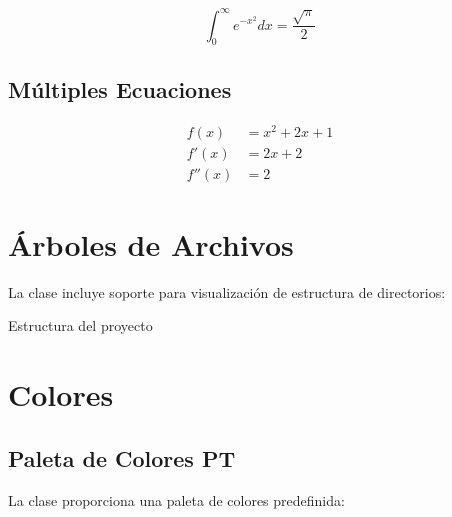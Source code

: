 \documentclass{pt-article}
\begin{document}
\begin{equation}
    \int_{0}^{\infty} e^{-x^2} dx = \frac{\sqrt{\pi}}{2}
    \label{eq:gaussian}
\end{equation}

\subsection{Múltiples Ecuaciones}

\begin{align}
    f(x) &= x^2 + 2x + 1 \\
    f'(x) &= 2x + 2 \\
    f''(x) &= 2
\end{align}

\section{Árboles de Archivos}

La clase incluye soporte para visualización de estructura de directorios:

\begin{filetree}
\begin{ptdirtree}
\end{ptdirtree}
\caption{Estructura del proyecto}
\label{fig:tree}
\end{filetree}

\section{Colores}

\subsection{Paleta de Colores PT}

La clase proporciona una paleta de colores predefinida:
\end{document}
